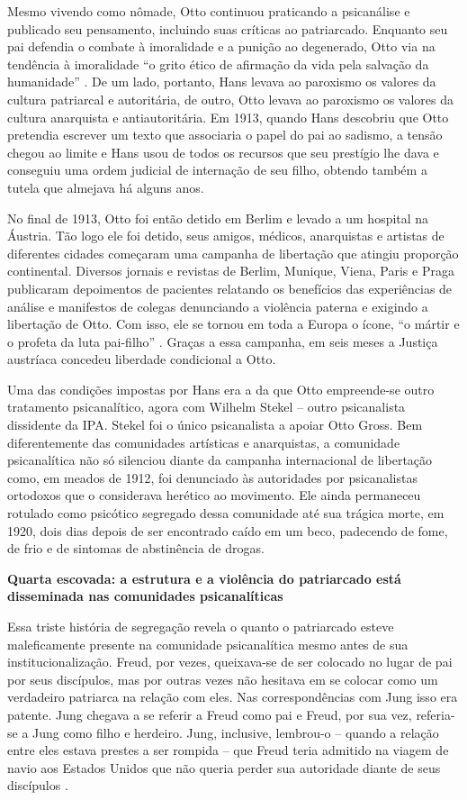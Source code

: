 Mesmo vivendo como nômade, Otto continuou praticando a psicanálise e
publicado seu pensamento, incluindo suas críticas ao patriarcado.
Enquanto seu pai defendia o combate à imoralidade e a punição ao
degenerado, Otto via na tendência à imoralidade ``o grito ético de
afirmação da vida pela salvação da humanidade'' . De um lado, portanto,
Hans levava ao paroxismo os valores da cultura patriarcal e autoritária,
de outro, Otto levava ao paroxismo os valores da cultura anarquista e
antiautoritária. Em 1913, quando Hans descobriu que Otto pretendia
escrever um texto que associaria o papel do pai ao sadismo, a tensão
chegou ao limite e Hans usou de todos os recursos que seu prestígio lhe
dava e conseguiu uma ordem judicial de internação de seu filho, obtendo
também a tutela que almejava há alguns anos.

No final de 1913, Otto foi então detido em Berlim e levado a um hospital
na Áustria. Tão logo ele foi detido, seus amigos, médicos, anarquistas e
artistas de diferentes cidades começaram uma campanha de libertação que
atingiu proporção continental. Diversos jornais e revistas de Berlim,
Munique, Viena, Paris e Praga publicaram depoimentos de pacientes
relatando os benefícios das experiências de análise e manifestos de
colegas denunciando a violência paterna e exigindo a libertação de Otto.
Com isso, ele se tornou em toda a Europa o ícone, ``o mártir e o profeta
da luta pai-filho'' . Graças a essa campanha, em seis meses a Justiça
austríaca concedeu liberdade condicional a Otto.

Uma das condições impostas por Hans era a da que Otto empreende-se outro
tratamento psicanalítico, agora com Wilhelm Stekel -- outro psicanalista
dissidente da IPA. Stekel foi o único psicanalista a apoiar Otto Gross.
Bem diferentemente das comunidades artísticas e anarquistas, a
comunidade psicanalítica não só silenciou diante da campanha
internacional de libertação como, em meados de 1912, foi denunciado às
autoridades por psicanalistas ortodoxos que o considerava herético ao
movimento. Ele ainda permaneceu rotulado como psicótico segregado dessa
comunidade até sua trágica morte, em 1920, dois dias depois de ser
encontrado caído em um beco, padecendo de fome, de frio e de sintomas de
abstinência de drogas.

\textbf{Quarta escovada: a estrutura e a violência do patriarcado está
disseminada nas comunidades psicanalíticas}

Essa triste história de segregação revela o quanto o patriarcado esteve
maleficamente presente na comunidade psicanalítica mesmo antes de sua
institucionalização. Freud, por vezes, queixava-se de ser colocado no
lugar de pai por seus discípulos, mas por outras vezes não hesitava em
se colocar como um verdadeiro patriarca na relação com eles. Nas
correspondências com Jung isso era patente. Jung chegava a se referir a
Freud como pai e Freud, por sua vez, referia-se a Jung como filho e
herdeiro. Jung, inclusive, lembrou-o -- quando a relação entre eles
estava prestes a ser rompida -- que Freud teria admitido na viagem de
navio aos Estados Unidos que não queria perder sua autoridade diante de
seus discípulos .

